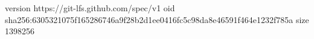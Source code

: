 version https://git-lfs.github.com/spec/v1
oid sha256:6305321075f165286746a9f28b2d1ee0416fc5c98da8e46591f464e1232f785a
size 1398256
